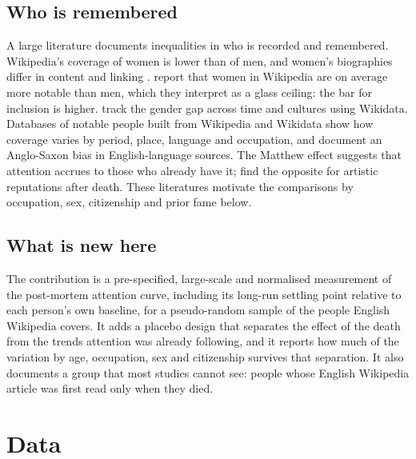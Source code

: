 \documentclass[11pt,a4paper]{article}
\begin{document}
\subsection{Who is remembered}
A large literature documents inequalities in who is recorded and remembered. Wikipedia's coverage of women is lower than of men, and women's biographies differ in content and linking \citep{wagner2015,graellsgarrido2015,wagner2016}. \citet{wagner2016} report that women in Wikipedia are on average more notable than men, which they interpret as a glass ceiling: the bar for inclusion is higher. \citet{konieczny2018} track the gender gap across time and cultures using Wikidata. Databases of notable people built from Wikipedia and Wikidata \citep{yu2016,gergaud2016,laouenan2022} show how coverage varies by period, place, language and occupation, and \citet{laouenan2022} document an Anglo-Saxon bias in English-language sources. The Matthew effect \citep{merton1968} suggests that attention accrues to those who already have it; \citet{zhang2023} find the opposite for artistic reputations after death. These literatures motivate the comparisons by occupation, sex, citizenship and prior fame below.

\subsection{What is new here}
The contribution is a pre-specified, large-scale and normalised measurement of the post-mortem attention curve, including its long-run settling point relative to each person's own baseline, for a pseudo-random sample of the people English Wikipedia covers. It adds a placebo design that separates the effect of the death from the trends attention was already following, and it reports how much of the variation by age, occupation, sex and citizenship survives that separation. It also documents a group that most studies cannot see: people whose English Wikipedia article was first read only when they died.

\section{Data}\label{sec:data}
\end{document}
